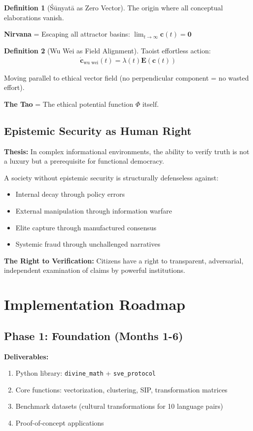 \documentclass[11pt,a4paper]{article}
\theoremstyle{definition}
\newtheorem{definition}{Definition}[section]
\theoremstyle{remark}
\newcommand{\EE}{\mathbf{E}}
\newcommand{\cc}{\mathbf{c}}
\begin{document}
\begin{small}
\begin{definition}[Śūnyatā as Zero Vector]
The origin where all conceptual elaborations vanish.

\textbf{Nirvana} = Escaping all attractor basins: $\lim_{t \to \infty} \cc(t) = \mathbf{0}$
\end{definition}

\begin{definition}[Wu Wei as Field Alignment]
Taoist effortless action:
\begin{align}
\dot{\cc}_{\text{wu wei}}(t) = \lambda(t) \EE(\cc(t))
\end{align}

Moving parallel to ethical vector field (no perpendicular component = no wasted effort).

\textbf{The Tao} = The ethical potential function $\Phi$ itself.
\end{definition}

\subsection{Epistemic Security as Human Right}

\textbf{Thesis:} In complex informational environments, the ability to verify truth is not a luxury but a prerequisite for functional democracy.

A society without epistemic security is structurally defenseless against:
\begin{itemize}
\item Internal decay through policy errors
\item External manipulation through information warfare
\item Elite capture through manufactured consensus
\item Systemic fraud through unchallenged narratives
\end{itemize}

\textbf{The Right to Verification:} Citizens have a right to transparent, adversarial, independent examination of claims by powerful institutions.

\section{Implementation Roadmap}

\subsection{Phase 1: Foundation (Months 1-6)}

\textbf{Deliverables:}
\begin{enumerate}
\item Python library: \texttt{divine\_math} + \texttt{sve\_protocol}
\item Core functions: vectorization, clustering, SIP, transformation matrices
\item Benchmark datasets (cultural transformations for 10 language pairs)
\item Proof-of-concept applications
\end{enumerate}


\end{small}
\end{document}
